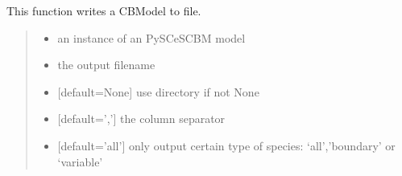 \documentclass[letterpaper,12pt,english]{sphinxmanual}
\begin{document}
\begin{fulllineitems}

\pysigstartsignatures
\pysiglinewithargsret
{}
{\sphinxparamcomma {}\sphinxparamcomma {}\sphinxparamcomma {}\sphinxparamcomma {}}
{}
\pysigstopsignatures
\sphinxAtStartPar
This function writes a CBModel to file.
\begin{quote}\begin{description}
\begin{itemize}
\item {} 
\sphinxAtStartPar
{} \textendash{} an instance of an PySCeSCBM model

\item {} 
\sphinxAtStartPar
{} \textendash{} the output filename

\item {} 
\sphinxAtStartPar
{} \textendash{} {[}default=None{]} use directory if not None

\item {} 
\sphinxAtStartPar
{} \textendash{} {[}default=’,’{]} the column separator

\item {} 
\sphinxAtStartPar
{} \textendash{} {[}default=’all’{]} only output certain type of species: ‘all’,’boundary’ or ‘variable’

\end{itemize}

\end{description}\end{quote}

\end{fulllineitems}
\end{document}
